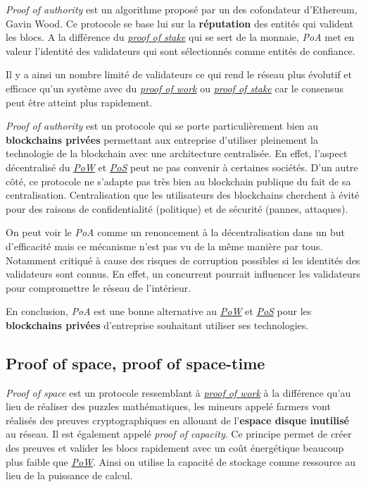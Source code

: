 \documentclass[../tb_report.tex]{subfiles}
\begin{document}
\textit{Proof of authority} est un algorithme proposé par un des cofondateur d'Ethereum, Gavin Wood. Ce protocole se base lui sur la \textbf{réputation} des entités qui valident les blocs. A la différence du \hyperref[consensus:pos]{\textit{proof of stake}} qui se sert de la monnaie, \textit{PoA} met en valeur l'identité des validateurs qui sont sélectionnés comme entités de confiance.

Il y a ainsi un nombre limité de validateurs ce qui rend le réseau plus évolutif et efficace qu'un système avec du \hyperref[consensus:pow]{\textit{proof of work}} ou \hyperref[consensus:pos]{\textit{proof of stake}} car le consensus peut être atteint plus rapidement.

\textit{Proof of authority} est un protocole qui se porte particulièrement bien au \textbf{blockchains privées} permettant aux entreprise d'utiliser pleinement la technologie de la blockchain avec une architecture centralisée. En effet, l'aspect décentralisé du \hyperref[consensus:pow]{\textit{PoW}} et \hyperref[consensus:pos]{\textit{PoS}} peut ne pas convenir à certaines sociétés. D'un autre côté, ce protocole ne s'adapte pas très bien au blockchain publique du fait de sa centralisation. Centralisation que les utilisateurs des blockchains cherchent à évité pour des raisons de confidentialité (politique) et de sécurité (pannes, attaques).

On peut voir le \textit{PoA} comme un renoncement à la décentralisation dans un but d'efficacité mais ce mécanisme n'est pas vu de la même manière par tous. Notamment critiqué à cause des risques de corruption possibles si les identités des validateurs sont connus. En effet, un concurrent pourrait influencer les validateurs pour compromettre le réseau de l'intérieur.

En conclusion, \textit{PoA} est une bonne alternative au \hyperref[consensus:pow]{\textit{PoW}} et \hyperref[consensus:pos]{\textit{PoS}} pour les \textbf{blockchains privées} d'entreprise souhaitant utiliser ses technologies.

\subsection{Proof of space, proof of space-time}

\textit{Proof of space} est un protocole ressemblant à \hyperref[consensus:pow]{\textit{proof of work}} à la différence qu'au lieu de réaliser des puzzles mathématiques, les mineurs appelé farmers vont réalisés des preuves cryptographiques en allouant de l'\textbf{espace disque inutilisé} au réseau. Il est également appelé \textit{proof of capacity}. Ce principe permet de créer des preuves et valider les blocs rapidement avec un coût énergétique beaucoup plus faible que \hyperref[consensus:pow]{\textit{PoW}}. Ainsi on utilise la capacité de stockage comme ressource au lieu de la puissance de calcul.
\end{document}
